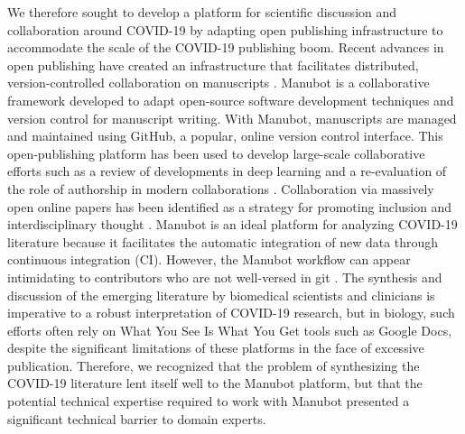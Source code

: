 \documentclass[twocolumn]{ceurart}
\begin{document}
We therefore sought to develop a platform for scientific discussion and collaboration around COVID-19 by adapting open publishing infrastructure to accommodate the scale of the COVID-19 publishing boom.
Recent advances in open publishing have created an infrastructure that facilitates distributed, version-controlled collaboration on manuscripts \citep{YuJbg3zO}.
Manubot \citep{YuJbg3zO} is a collaborative framework developed to adapt open-source software development techniques and version control for manuscript writing.
With Manubot, manuscripts are managed and maintained using GitHub, a popular, online version control interface.
This open-publishing platform has been used to develop large-scale collaborative efforts such as a review of developments in deep learning \citep{PZMP42Ak} and a re-evaluation of the role of authorship in modern collaborations \citep{6acsZuy7}.
Collaboration via massively open online papers has been identified as a strategy for promoting inclusion and interdisciplinary thought \citep{PoDz2q0A}.
Manubot is an ideal platform for analyzing COVID-19 literature because it facilitates the automatic integration of new data through continuous integration (CI).
However, the Manubot workflow can appear intimidating to contributors who are not well-versed in git \citep{PoDz2q0A}.
The synthesis and discussion of the emerging literature by biomedical scientists and clinicians is imperative to a robust interpretation of COVID-19 research, but in biology, such efforts often rely on What You See Is What You Get tools such as Google Docs, despite the significant limitations of these platforms in the face of excessive publication.
Therefore, we recognized that the problem of synthesizing the COVID-19 literature lent itself well to the Manubot platform, but that the potential technical expertise required to work with Manubot presented a significant technical barrier to domain experts.
\end{document}
